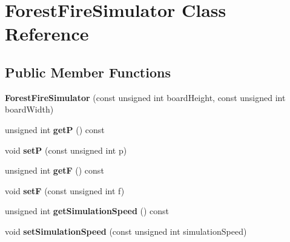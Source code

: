 \hypertarget{class_forest_fire_simulator}{}\section{Forest\+Fire\+Simulator Class Reference}
\label{class_forest_fire_simulator}
\subsection*{Public Member Functions}
\begin{DoxyCompactItemize}
\item 
{\bfseries Forest\+Fire\+Simulator} (const unsigned int board\+Height, const unsigned int board\+Width)\hypertarget{class_forest_fire_simulator_ad4fba2e51cdbb5abec973c9da6c69a99}{}\label{class_forest_fire_simulator_ad4fba2e51cdbb5abec973c9da6c69a99}

\item 
unsigned int {\bfseries getP} () const \hypertarget{class_forest_fire_simulator_abd62bb21fa4a05ee1d475fa916eff159}{}\label{class_forest_fire_simulator_abd62bb21fa4a05ee1d475fa916eff159}

\item 
void {\bfseries setP} (const unsigned int p)\hypertarget{class_forest_fire_simulator_a1cfe5e00f57b8625145e73eb12c646e9}{}\label{class_forest_fire_simulator_a1cfe5e00f57b8625145e73eb12c646e9}

\item 
unsigned int {\bfseries getF} () const \hypertarget{class_forest_fire_simulator_ac1a72802459fb576502beb86f3270ab4}{}\label{class_forest_fire_simulator_ac1a72802459fb576502beb86f3270ab4}

\item 
void {\bfseries setF} (const unsigned int f)\hypertarget{class_forest_fire_simulator_a02f12aff84faa527fc33fca0ea9cff4c}{}\label{class_forest_fire_simulator_a02f12aff84faa527fc33fca0ea9cff4c}

\item 
unsigned int {\bfseries get\+Simulation\+Speed} () const \hypertarget{class_forest_fire_simulator_afaebdfd0e4a3e0f87fa4a628e70079d1}{}\label{class_forest_fire_simulator_afaebdfd0e4a3e0f87fa4a628e70079d1}

\item 
void {\bfseries set\+Simulation\+Speed} (const unsigned int simulation\+Speed)\hypertarget{class_forest_fire_simulator_a5596e93b9ebd71f1f3be55cd825c87b7}{}\label{class_forest_fire_simulator_a5596e93b9ebd71f1f3be55cd825c87b7}


\end{DoxyCompactItemize}
